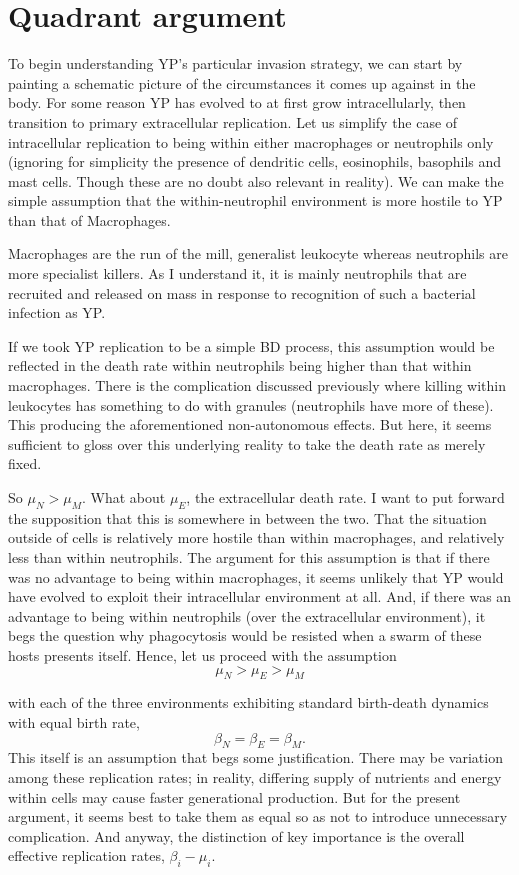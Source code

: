 \section{Quadrant argument}



To begin  understanding YP's particular invasion strategy, we can start by painting a schematic picture of the circumstances it comes up against in the body. For some reason YP has evolved to at first grow intracellularly, then transition to primary extracellular replication. Let us simplify
 the case of intracellular replication to being within either macrophages or neutrophils only (ignoring for simplicity the presence of dendritic cells, eosinophils, basophils and mast cells. Though these are no doubt also relevant in reality). We can make the simple assumption that the within-neutrophil environment is more hostile to YP than that of Macrophages. 

Macrophages are the run of the mill, generalist leukocyte whereas neutrophils are more specialist killers. As I understand it, it is mainly neutrophils that are recruited and released on mass in response to recognition of such a bacterial infection as YP.  

If we took YP replication to be a simple BD process, this assumption would be reflected in the death rate within neutrophils being higher than that within macrophages. There is the complication discussed previously where killing within leukocytes has something to do with granules (neutrophils
 have more of these). This producing the aforementioned non-autonomous effects. But here, it seems sufficient to gloss over this underlying reality to take the death rate as merely fixed. 

So $\mu_N > \mu_M$. What about $\mu_E$, the extracellular death rate. I want to put forward the supposition that this is somewhere in between the two. That the situation outside of cells is relatively more hostile than within macrophages, and relatively less than within neutrophils. 
The argument for this assumption is that if there was no advantage to being within macrophages, it seems unlikely that YP would have evolved to exploit their intracellular environment at all. And, if there was an advantage to being within neutrophils (over the extracellular environment), it begs the question why phagocytosis would
 be resisted when a swarm of these hosts presents itself. Hence, let us proceed with the assumption 
$$\mu_N > \mu_E > \mu_M$$

with each of the three environments exhibiting standard birth-death dynamics with equal birth rate,
$$\beta_N = \beta _E = \beta_M.$$
This itself is an assumption that begs some justification. There may be variation among these replication rates; in reality, differing supply of nutrients and energy within cells may cause faster generational production. But for the present argument, it seems best to take them as equal so as not to introduce unnecessary complication. And anyway, the distinction of key importance is the overall effective replication rates, $\beta_i - \mu_i$. 



